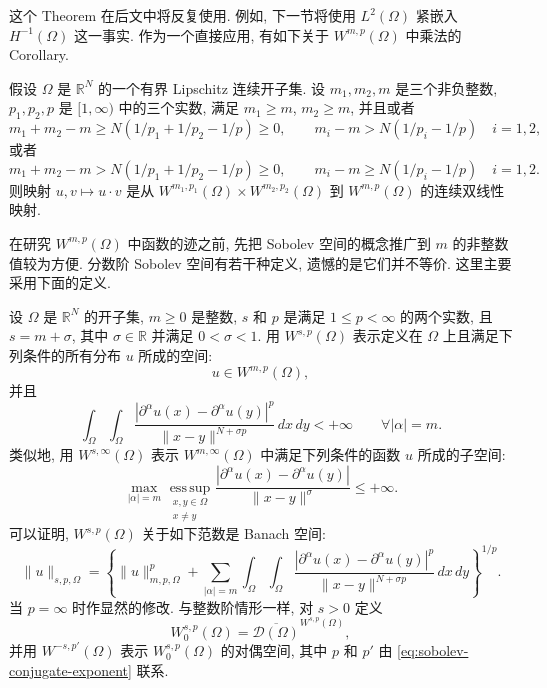 这个 Theorem 在后文中将反复使用. 例如, 下一节将使用 $L^2(\Omega)$ 紧嵌入
$H^{-1}(\Omega)$ 这一事实. 作为一个直接应用, 有如下关于 $W^{m,p}(\Omega)$ 中乘法的 Corollary.

\setcounter{statement}{0}
\renewcommand{\theHstatement}{corollary.\thesection.\arabic{statement}}
\begin{Corollary}\label{cor:sobolev-product}
假设 $\Omega$ 是 $\mathbb R^N$ 的一个有界 Lipschitz 连续开子集. 设 $m_1,m_2,m$ 是三个非负整数,
$p_1,p_2,p$ 是 $[1,\infty)$ 中的三个实数, 满足 $m_1\geq m$, $m_2\geq m$, 并且或者
\[
m_1+m_2-m\geq N(1/p_1+1/p_2-1/p)\geq0,
\qquad m_i-m>N(1/p_i-1/p)\quad i=1,2,
\]
或者
\[
m_1+m_2-m>N(1/p_1+1/p_2-1/p)\geq0,
\qquad m_i-m\geq N(1/p_i-1/p)\quad i=1,2.
\]
则映射 $u,v\mapsto u\cdot v$ 是从 $W^{m_1,p_1}(\Omega)\times W^{m_2,p_2}(\Omega)$ 到
$W^{m,p}(\Omega)$ 的连续双线性映射.
\end{Corollary}

在研究 $W^{m,p}(\Omega)$ 中函数的迹之前, 先把 Sobolev 空间的概念推广到 $m$ 的非整数值较为方便.
分数阶 Sobolev 空间有若干种定义, 遗憾的是它们并不等价. 这里主要采用下面的定义.

\setcounter{statement}{1}
\renewcommand{\theHstatement}{definition.\thesection.\arabic{statement}}
\begin{Definition}\label{def:fractional-sobolev}
设 $\Omega$ 是 $\mathbb R^N$ 的开子集, $m\geq0$ 是整数, $s$ 和 $p$ 是满足
$1\leq p<\infty$ 的两个实数, 且 $s=m+\sigma$, 其中 $\sigma\in\mathbb R$ 并满足
$0<\sigma<1$. 用 $W^{s,p}(\Omega)$ 表示定义在 $\Omega$ 上且满足下列条件的所有分布 $u$ 所成的空间:
\[
u\in W^{m,p}(\Omega),
\]
并且
\[
\int_\Omega\int_\Omega
\frac{|\partial^\alpha u(x)-\partial^\alpha u(y)|^p}
{\|x-y\|^{N+\sigma p}}\,dx\,dy<+\infty
\qquad\forall|\alpha|=m.
\]
类似地, 用 $W^{s,\infty}(\Omega)$ 表示 $W^{m,\infty}(\Omega)$ 中满足下列条件的函数 $u$ 所成的子空间:
\[
\max_{|\alpha|=m}\operatorname*{ess\,sup}_{\substack{x,y\in\Omega\\x\neq y}}
\frac{|\partial^\alpha u(x)-\partial^\alpha u(y)|}
{\|x-y\|^\sigma}\leq+\infty.
\]
可以证明, $W^{s,p}(\Omega)$ 关于如下范数是 Banach 空间:
\begin{equation}\label{eq:fractional-sobolev-norm}
\|u\|_{s,p,\Omega}=\left\{\|u\|_{m,p,\Omega}^p+
\sum_{|\alpha|=m}\int_\Omega\int_\Omega
\frac{|\partial^\alpha u(x)-\partial^\alpha u(y)|^p}
{\|x-y\|^{N+\sigma p}}\,dx\,dy\right\}^{1/p}.
\end{equation}
当 $p=\infty$ 时作显然的修改. 与整数阶情形一样, 对 $s>0$ 定义
\[
W_0^{s,p}(\Omega)=\overline{\mathcal D(\Omega)}^{W^{s,p}(\Omega)},
\]
并用 $W^{-s,p'}(\Omega)$ 表示 $W_0^{s,p}(\Omega)$ 的对偶空间, 其中 $p$ 和 $p'$ 由
\eqref{eq:sobolev-conjugate-exponent} 联系.
\end{Definition}

